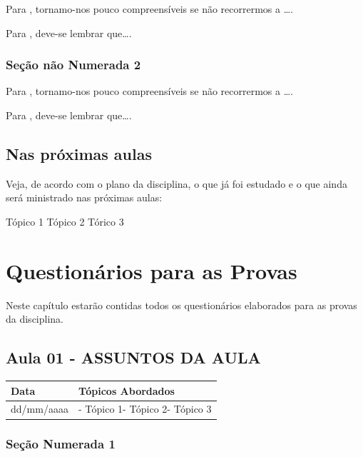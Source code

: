 \documentclass[
]{book}
\begin{document}
Para \citet{BOCK2001}, tornamo-nos pouco compreensíveis se não recorrermos a \ldots.

Para \citet{DAVIDOFF2001}, deve-se lembrar que\ldots.

\hypertarget{seuxe7uxe3o-nuxe3o-numerada-2-74}{%
\subsection*{Seção não Numerada 2}\label{seuxe7uxe3o-nuxe3o-numerada-2-74}}

Para \citet{BOCK2001}, tornamo-nos pouco compreensíveis se não recorrermos a \ldots.

Para \citet{DAVIDOFF2001}, deve-se lembrar que\ldots.

\hypertarget{nas-pruxf3ximas-aulas-10}{%
\section{Nas próximas aulas}\label{nas-pruxf3ximas-aulas-10}}

Veja, de acordo com o plano da disciplina, o que já foi estudado e o que ainda será ministrado nas próximas aulas:

Tópico 1
Tópico 2
Tórico 3

\hypertarget{questionuxe1rios-para-as-provas-1}{%
\chapter{Questionários para as Provas}\label{questionuxe1rios-para-as-provas-1}}

Neste capítulo estarão contidas todos os questionários elaborados para as provas da disciplina.

\hypertarget{aula-01---assuntos-da-aula-7}{%
\section{Aula 01 - ASSUNTOS DA AULA}\label{aula-01---assuntos-da-aula-7}}

\begin{longtable}[]{@{}ll@{}}
\toprule()
Data & Tópicos Abordados \\
\midrule()
\endhead
dd/mm/aaaa & - Tópico 1- Tópico 2- Tópico 3 \\
\bottomrule()
\end{longtable}

\hypertarget{seuxe7uxe3o-numerada-1-25}{%
\subsection{Seção Numerada 1}\label{seuxe7uxe3o-numerada-1-25}}
\end{document}
